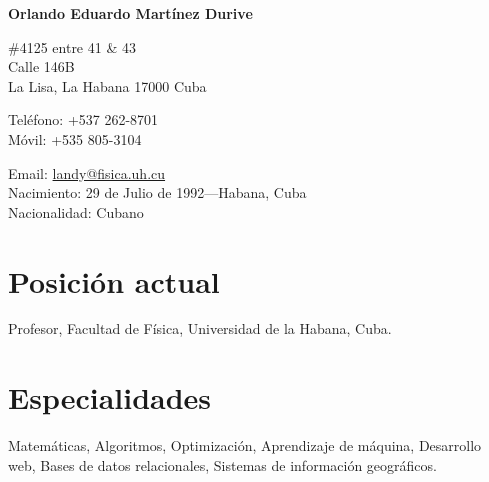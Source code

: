 \documentclass[11pt]{article} %
\begin{document}

{\LARGE\bfseries Orlando Eduardo Mart\'inez Durive} %
\bigskip\bigskip\medskip %

\#4125 entre 41 \& 43 \\ %
Calle 146B\\ La Lisa, La Habana 17000 Cuba
\medskip %

Tel\'efono:  +537 262-8701\\ %
M\'ovil: +535 805-3104 %
\medskip %

Email: \href{mailto:landy@fisica.uh.cu}{landy@fisica.uh.cu}\\ %



Nacimiento: 29 de Julio de 1992---Habana, Cuba\\ %
Nacionalidad: Cubano %


\section*{Posici\'on actual}

Profesor, Facultad de F\'isica, Universidad de la Habana, Cuba. %


\section*{Especialidades}

Matem\'aticas, Algoritmos, Optimizaci\'on, Aprendizaje de m\'aquina, Desarrollo web, Bases de datos relacionales, Sistemas de informaci\'on geogr\'aficos. %
\end{document}
